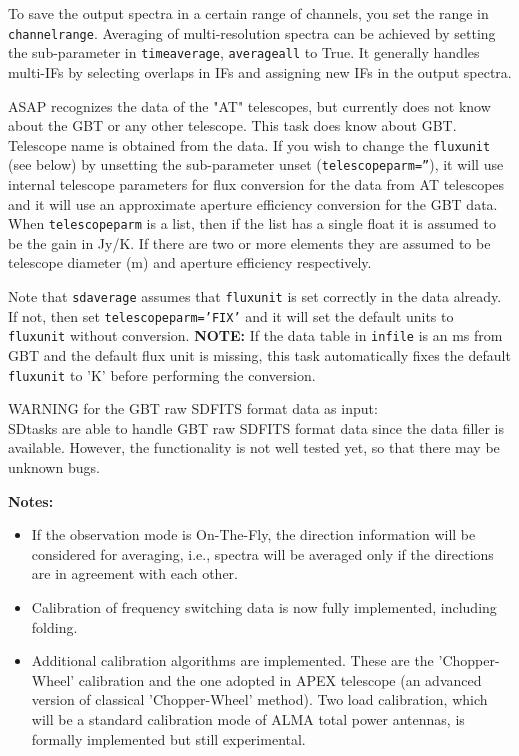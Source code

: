 To save the output spectra in a certain range of 
channels, you set the range in {\tt channelrange}.
Averaging of multi-resolution
spectra can be achieved by setting the sub-parameter in {\tt timeaverage}, {\tt averageall} 
to True. It generally handles multi-IFs by selecting overlaps in IFs and assigning
new IFs in the output spectra.

ASAP recognizes the data of the "AT" telescopes, but currently
does not know about the GBT or any other telescope. This task
does know about GBT. Telescope name is obtained from the data.
If you wish to change the {\tt fluxunit} (see below) by unsetting
the sub-parameter unset ({\tt telescopeparm=''}),
it will use internal telescope parameters for
flux conversion for the data from AT telescopes and it will use an
approximate aperture efficiency conversion for the GBT data.
When {\tt telescopeparm} is a list, then if the list has a single float it
is assumed to be the gain in Jy/K.  If there are two or more elements they are assumed
to be telescope diameter (m) and aperture efficiency
respectively.

Note that {\tt sdaverage} assumes that {\tt fluxunit} is set correctly in
the data already.  If not, then set {\tt telescopeparm='FIX'} and it
will set the default units to {\tt fluxunit} without conversion.
{\bf NOTE:} If the data table in {\tt infile} is an ms from GBT and the default flux
unit is missing, this task automatically fixes the default {\tt fluxunit}
to 'K' before performing the conversion.

WARNING for the GBT raw SDFITS format data as input:\\
SDtasks are able to handle GBT raw SDFITS format data since the 
data filler is available. However, the functionality is not well 
tested yet, so that there may be unknown bugs. 

\medskip
{\bf Notes:}
 \begin{itemize}
  \item If the observation mode is On-The-Fly, the direction
information will be considered for averaging, i.e., spectra will be
averaged only if the directions are in agreement with each other.
  \item Calibration of frequency switching data is now fully implemented, including folding.
  \item Additional calibration algorithms are implemented. These are the
'Chopper-Wheel' calibration and the one adopted in APEX telescope (an advanced version of classical 'Chopper-Wheel' method). Two load
calibration, which will be a standard calibration mode of ALMA total
power antennas, is formally implemented but still experimental.
\end{itemize}


